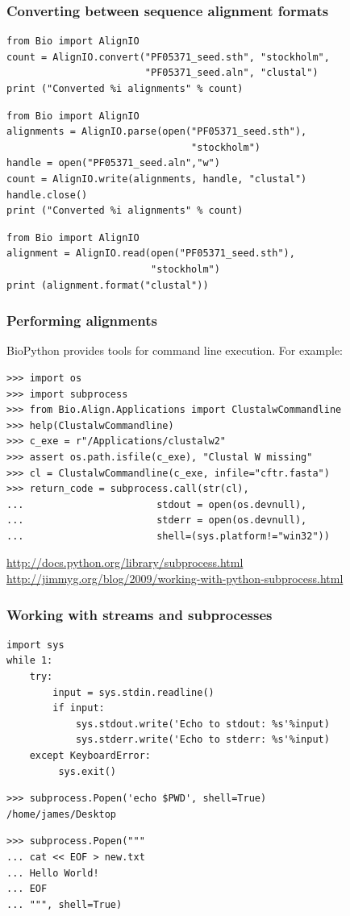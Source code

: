 \documentclass{beamer}
\begin{document}
\begin{frame}[containsverbatim]
\frametitle{Converting between sequence alignment formats}
\begin{lstlisting}
from Bio import AlignIO
count = AlignIO.convert("PF05371_seed.sth", "stockholm",
                        "PF05371_seed.aln", "clustal")
print ("Converted %i alignments" % count)
\end{lstlisting}
\begin{lstlisting}
from Bio import AlignIO
alignments = AlignIO.parse(open("PF05371_seed.sth"), 
                                "stockholm")
handle = open("PF05371_seed.aln","w")
count = AlignIO.write(alignments, handle, "clustal")
handle.close()
print ("Converted %i alignments" % count)
\end{lstlisting}
\begin{lstlisting}
from Bio import AlignIO
alignment = AlignIO.read(open("PF05371_seed.sth"), 
                         "stockholm")
print (alignment.format("clustal"))
\end{lstlisting}
\end{frame}

\begin{frame}[containsverbatim]
\frametitle{Performing alignments}
BioPython provides tools for command line execution. For example:
\begin{lstlisting}
>>> import os
>>> import subprocess
>>> from Bio.Align.Applications import ClustalwCommandline
>>> help(ClustalwCommandline)
>>> c_exe = r"/Applications/clustalw2"
>>> assert os.path.isfile(c_exe), "Clustal W missing"
>>> cl = ClustalwCommandline(c_exe, infile="cftr.fasta")
>>> return_code = subprocess.call(str(cl),
...                       stdout = open(os.devnull),
...                       stderr = open(os.devnull),
...                       shell=(sys.platform!="win32"))
\end{lstlisting}
\tiny
\url{http://docs.python.org/library/subprocess.html}
\url{http://jimmyg.org/blog/2009/working-with-python-subprocess.html}
\normalsize
\end{frame}

\begin{frame}[containsverbatim]
\frametitle{Working with streams and subprocesses}
\begin{lstlisting}
import sys
while 1:
    try:
        input = sys.stdin.readline()
        if input:
            sys.stdout.write('Echo to stdout: %s'%input)
            sys.stderr.write('Echo to stderr: %s'%input)
    except KeyboardError:
         sys.exit()
\end{lstlisting}
\begin{lstlisting}
>>> subprocess.Popen('echo $PWD', shell=True)
/home/james/Desktop
\end{lstlisting}
\begin{lstlisting}
>>> subprocess.Popen("""
... cat << EOF > new.txt
... Hello World!
... EOF
... """, shell=True)
\end{lstlisting}
\end{frame}
\end{document}
